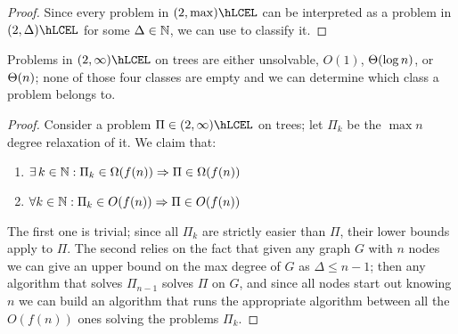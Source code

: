 \documentclass[12pt,a4paper]{article}
\begin{document}
\begin{proof}
    Since every problem in $(2,\max)\hLCEL$ can be interpreted as a problem in $(2,\Delta)\hLCEL$ for some $\Delta\in\mathbb{N}$, we can use  to classify it.
\end{proof}
\begin{thm}\label{thm:infclass}
    Problems in $(2,\infty)\hLCEL$ on trees are either unsolvable, $O(1)$, $\Theta(\log n)$, or $\Theta(n)$; none of those four classes are empty and we can determine which class a problem belongs to. %
\end{thm}
\begin{proof}
    Consider a problem $\Pi\in(2,\infty)\hLCEL$ on trees; let $\Pi_k$ be the $\max n$ degree relaxation of it. %
    We claim that:
    \begin{enumerate}%
        \item $\exists k\in\N: \Pi_k\in\Omega(f(n))\Rightarrow \Pi\in\Omega(f(n))$
        \item $\forall k\in\mathbb{N}: \Pi_k\in O(f(n))\Rightarrow \Pi\in O(f(n))$
    \end{enumerate}
    The first one is trivial; since all $\Pi_k$ are strictly easier than $\Pi$, their lower bounds apply to $\Pi$. The second relies on the fact that given any graph $G$ with $n$ nodes we can give an upper bound on the max degree of $G$ as $\Delta\leq n-1$; then any algorithm that solves $\Pi_{n-1}$ solves $\Pi$ on $G$, and since all nodes start out knowing $n$ we can build an algorithm that runs the appropriate algorithm between all the $O(f(n))$ ones solving the problems $\Pi_k$. %


\end{proof}
\end{document}
